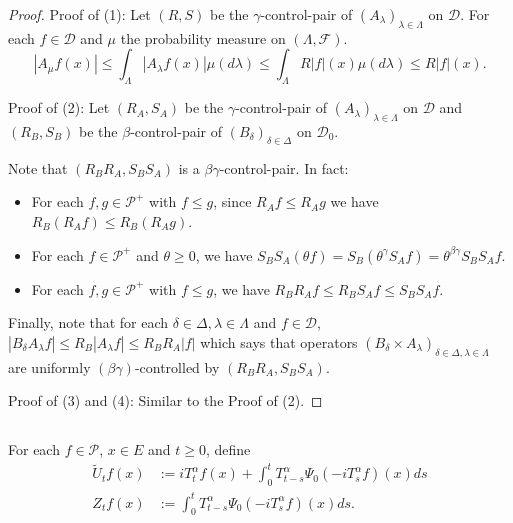 \documentclass[12pt,oneside,english]{amsart}
\theoremstyle{plain}
\theoremstyle{definition}
\numberwithin{equation}{section}
\newcommand{\added}[1]{{\color{blue}#1}}\newcommand{\deleted}[1]{{\color{red}#1}}
\begin{document}
\begin{proof}
    Proof of (1): Let $(R,S)$ be the $\gamma$-control-pair of $(A_\lambda)_{\lambda\in\Lambda}$ on $\mathcal{D}$. For each $f \in \mathcal{D}$ and $\mu$ the probability measure on $(\Lambda, \mathscr F)$.
\[
   |A_{\mu}f(x)|\leq \int_{\Lambda}|A_{\lambda}f(x)|\mu(d\lambda) \leq \int_{\Lambda}R|f|(x)\mu(d\lambda) \leq R|f|(x).
\]

   	Proof of (2): Let $(R_A, S_A)$ be the $\gamma$-control-pair of $(A_\lambda)_{\lambda\in\Lambda}$ on $\mathcal{D}$ and $(R_B, S_B)$ be the $\beta$-control-pair of $(B_{\delta})_{\delta\in\Delta}$ on $\mathcal{D}_0$.
\added{
	Note that $(R_BR_A, S_BS_A)$ is a $\beta \gamma$-control-pair.
	In fact:
\begin{itemize}
\item
	For each $f,g \in \mathcal P^+$ with $f\leq g$, since $R_Af \leq R_A g$ we have $R_B(R_A f)\leq R_B(R_A g)$.
\item
	For each $f\in \mathcal{P}^+$ and $\theta \geq 0$, we have $S_BS_A(\theta f)=S_B(\theta^{\gamma}S_Af)=\theta^{\beta\gamma}S_BS_Af$.
\item
	For each $f,g \in \mathcal P^+$ with $f\leq g$, we have $R_B R_A f \leq R_B S_A f \leq S_BS_A f$.
\end{itemize}
	Finally, note that for each $\delta\in \Delta, \lambda\in\Lambda$ and $f\in \mathcal D$, $|B_{\delta}A_{\lambda}f|\leq R_B|A_{\lambda}f|\leq R_BR_A|f|$ which says that operators $(B_\delta\times A_\lambda)_{\delta \in \Delta, \lambda \in \Lambda}$ are uniformly $(\beta\gamma)$-controlled by $(R_BR_A,S_BS_A)$.
}

   Proof of (3) and (4): Similar to the Proof of (2).
\end{proof}
\subsection{}
    For each $f \in \mathcal{P}$, $x\in E$ and $t\geq 0$, define
\begin{align}
\label{eq: def of Zf}
    \tilde U_t f(x)
    &:= i T^\alpha_t f(x) + \int_0^t T^\alpha_{t-s} \Psi_0(-i T_s^{\alpha}f)(x)ds
    \\Z_t f (x)
    &:= \int_0^t T^\alpha_{t-s} \Psi_0(-i T_s^{\alpha}f)(x)ds.
\end{align}
\end{document}
